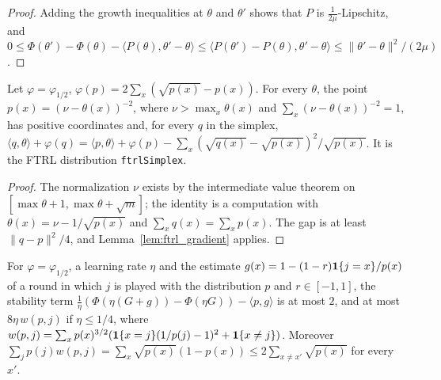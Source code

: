 \begin{proof}
  \leanok
  Adding the growth inequalities at $\theta$ and $\theta'$ shows that $P$ is
  $\frac{1}{2\mu}$-Lipschitz, and $0 \le \Phi(\theta') - \Phi(\theta) - \langle P(\theta),
  \theta' - \theta\rangle \le \langle P(\theta') - P(\theta), \theta' - \theta\rangle \le
  \|\theta' - \theta\|^2/(2\mu)$.
\end{proof}

\begin{lemma}
  \label{lem:tsallis_argmax}
  \leanok
  Let $\varphi = \varphi_{1/2}$, $\varphi(p) = 2\sum_x (\sqrt{p(x)} - p(x))$. For every $\theta$, the
  point $p(x) = (\nu - \theta(x))^{-2}$, where $\nu > \max_x \theta(x)$ and $\sum_x (\nu -
  \theta(x))^{-2} = 1$, has positive coordinates and, for every $q$ in the simplex,
  $\langle q, \theta\rangle + \varphi(q) = \langle p, \theta\rangle + \varphi(p) - \sum_x
  (\sqrt{q(x)} - \sqrt{p(x)})^2/\sqrt{p(x)}$. It is the FTRL distribution \texttt{ftrlSimplex}.
\end{lemma}

\begin{proof}
  \leanok
  The normalization $\nu$ exists by the intermediate value theorem on $[\max\theta + 1, \max\theta
  + \sqrt{m}]$; the identity is a computation with $\theta(x) = \nu - 1/\sqrt{p(x)}$ and $\sum_x
  q(x) = \sum_x p(x)$. The gap is at least $\|q - p\|^2/4$, and Lemma~\ref{lem:ftrl_gradient}
  applies.
\end{proof}

\begin{lemma}
  \label{lem:tsallis_stability}
  \leanok
  For $\varphi = \varphi_{1/2}$, a learning rate $\eta$ and the estimate $g(x) = 1 - (1 -
  r)\mathbf{1}\{j = x\}/p(x)$ of a round in which $j$ is played with the distribution $p$ and $r \in
  [-1, 1]$, the stability term $\frac1\eta(\Phi(\eta(G + g)) - \Phi(\eta G)) - \langle p, g\rangle$
  is at most $2$, and at most $8 \eta\, w(p, j)$ if $\eta \le 1/4$, where $w(p, j) = \sum_x
  p(x)^{3/2}(\mathbf{1}\{x = j\}(1/p(j) - 1)^2 + \mathbf{1}\{x \ne j\})$. Moreover $\sum_j p(j) w(p, j) =
  \sum_x \sqrt{p(x)}(1 - p(x)) \le 2\sum_{x \ne x'}\sqrt{p(x)}$ for every $x'$.
\end{lemma}

